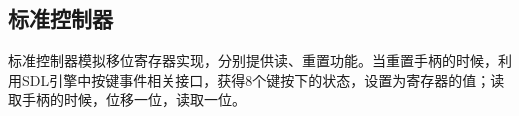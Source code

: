 \documentclass[a4paper]{ltxdoc}
\begin{document}
{%

\subsection{标准控制器}
标准控制器模拟移位寄存器实现，分别提供读、重置功能。当重置手柄的时候，利用SDL引擎中按键事件相关接口，获得8个键按下的状态，设置为寄存器的值；读取手柄的时候，位移一位，读取一位。




}
\end{document}
